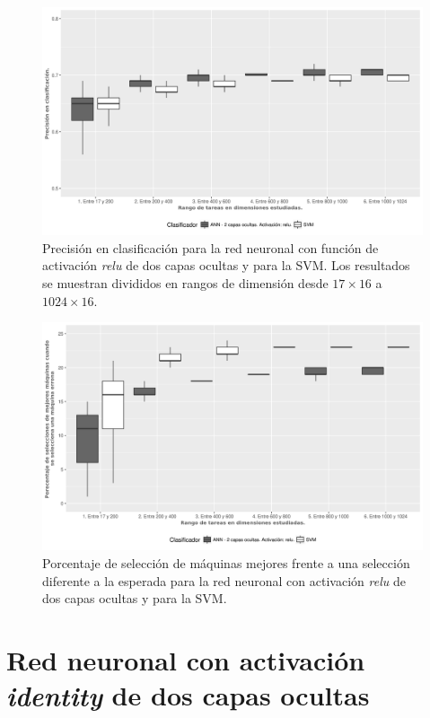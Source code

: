 \begin{figure}[H]
  \centering
  \includegraphics[width=\columnwidth]{imagenes/relu/3_accuracy_ann_2_capas_ocultas_relu.png}
  \caption{Precisión en clasificación para la red neuronal con función de activación \textit{relu} de dos capas ocultas y para la SVM.
Los resultados se muestran divididos en rangos de dimensión desde $ 17 \times 16$ a $ 1024 \times 16$.}
  \label{fig:relu_accuracy}
\end{figure}

\begin{figure}[H]
  \centering
  \includegraphics[width=\columnwidth]{imagenes/relu/4_porcentaje_maquinas_mejores_ann_2_capas_ocultas_relu.png}
  \caption{Porcentaje de selección de máquinas mejores frente a una selección diferente a la esperada para la red neuronal con activación \textit{relu} de dos capas ocultas y para la SVM.}
  \label{fig:relu_maquinas_mejores}
\end{figure}
 
\section{Red neuronal con activación \textit{identity} de dos capas ocultas}

